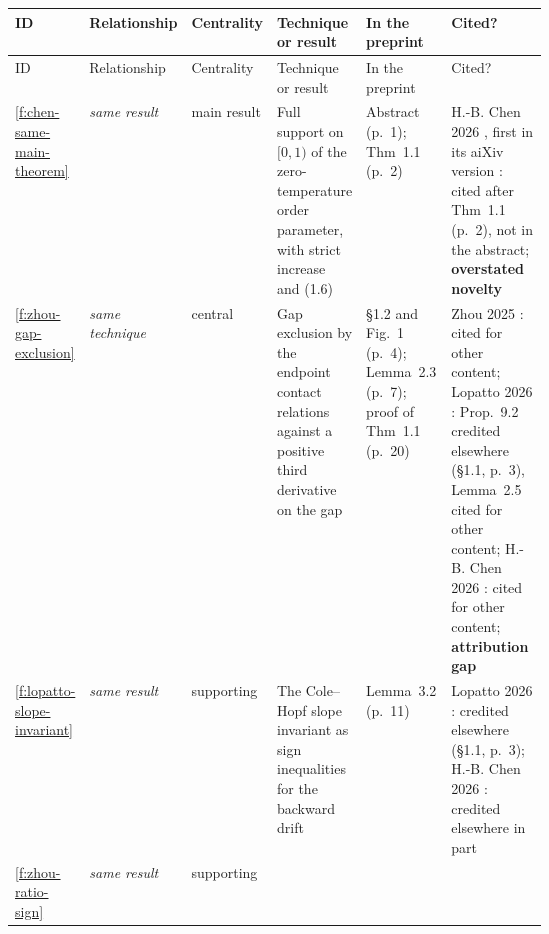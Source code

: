 \documentclass[11pt]{article}
\newcommand{\rel}[1]{\textit{#1}}
\newcommand{\attrgap}{\textbf{attribution gap}}
\newcommand{\overstated}{\textbf{overstated novelty}}
\newcounter{finding}
\begin{document}
\begin{center}\footnotesize
\begin{xltabular}{\linewidth}{@{}l >{\raggedright\arraybackslash}p{0.11\linewidth} >{\raggedright\arraybackslash}p{0.10\linewidth} >{\raggedright\arraybackslash}X >{\raggedright\arraybackslash}p{0.17\linewidth} >{\raggedright\arraybackslash}p{0.24\linewidth}@{}}
\toprule
ID & Relationship & Centrality & Technique or result & In the preprint & Cited?\\
\midrule
\endfirsthead
\toprule
ID & Relationship & Centrality & Technique or result & In the preprint & Cited?\\
\midrule
\endhead
\ref{f:chen-same-main-theorem} & \rel{same result} & main result &
Full support on $[0,1)$ of the zero-temperature order parameter, with strict
increase and (1.6) &
Abstract (p.~1); Thm~1.1 (p.~2) &
H.-B. Chen 2026 \cite{Chen2026-FRSBFullIntervalSupportZeroTemp}, first in
its aiXiv version \cite{ChatGPT2026-FRSBFullIntervalSupportZeroTemp}: cited
after Thm~1.1 (p.~2), not in the abstract; \overstated\\
\addlinespace
\ref{f:zhou-gap-exclusion} & \rel{same technique} & central &
Gap exclusion by the endpoint contact relations against a positive third
derivative on the gap &
\S1.2 and Fig.~1 (p.~4); Lemma~2.3 (p.~7); proof of Thm~1.1 (p.~20) &
Zhou 2025 \cite{Zhou2025-FRSBSKLowTemperature}: cited for other content;
Lopatto 2026 \cite{Lopatto2026-FullRSBSK}: Prop.~9.2 credited elsewhere
(\S1.1, p.~3), Lemma~2.5 cited for other content; H.-B. Chen 2026
\cite{Chen2026-FRSBFullIntervalSupportZeroTemp}: cited for other content;
\attrgap\\
\addlinespace
\ref{f:lopatto-slope-invariant} & \rel{same result} & supporting &
The Cole--Hopf slope invariant as sign inequalities for the backward drift &
Lemma~3.2 (p.~11) &
Lopatto 2026 \cite{Lopatto2026-FullRSBSK}: credited elsewhere (\S1.1,
p.~3); H.-B. Chen 2026 \cite{Chen2026-FRSBFullIntervalSupportZeroTemp}:
credited elsewhere in part\\
\addlinespace
\ref{f:zhou-ratio-sign} & \rel{same result} & supporting &

\end{xltabular}
\end{center}
\end{document}
